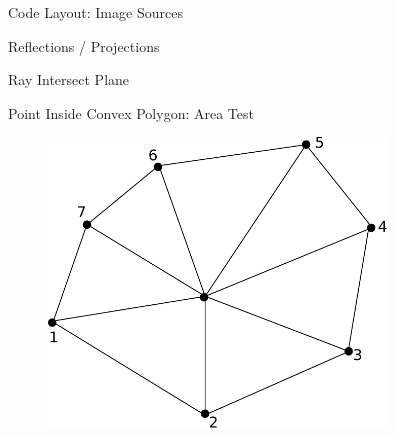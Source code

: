 \documentclass{beamer}
\begin{document}
\begin{frame}{Code Layout: Image Sources}

        

\end{frame}

\begin{frame}{Reflections / Projections}




\end{frame}


\begin{frame}{Ray Intersect Plane}



\end{frame}


\begin{frame}{Point Inside Convex Polygon: Area Test}

\begin{figure}[t]
\centering
\includegraphics[width=0.8\textwidth]{PointInsidePolygon.pdf}
\end{figure}


\end{frame}
\end{document}
